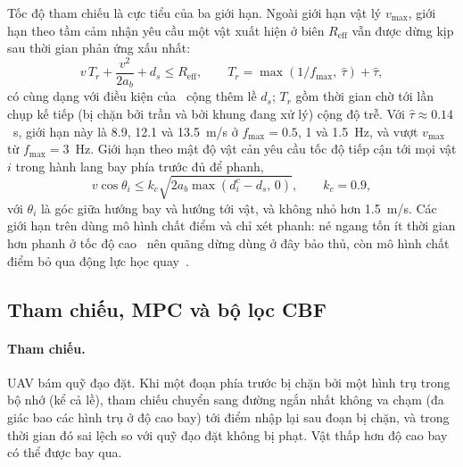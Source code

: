 \documentclass[11pt,a4paper]{article}
\theoremstyle{plain}
\theoremstyle{definition}
\theoremstyle{remark}
\newcommand{\fmax}{f_{\max}}
\newcommand{\tauh}{\hat{\tau}}
\newcommand{\Reff}{R_{\mathrm{eff}}}
\begin{document}
Tốc độ tham chiếu là cực tiểu của ba giới hạn. Ngoài giới hạn vật lý $v_{\max}$, giới hạn theo tầm cảm nhận yêu cầu một vật xuất hiện ở biên $\Reff$ vẫn được dừng kịp sau thời gian phản ứng xấu nhất:
\begin{equation}\label{eq:vperc}
v\,T_r + \frac{v^2}{2a_b} + d_s \le \Reff,\qquad T_r = \max(1/\fmax,\ \tauh) + \tauh,
\end{equation}
có cùng dạng với điều kiện của~\cite{liu2016} cộng thêm lề $d_s$; $T_r$ gồm thời gian chờ tới lần chụp kế tiếp (bị chặn bởi trần và bởi khung đang xử lý) cộng độ trễ. Với $\tauh \approx 0.14$~s, giới hạn này là 8.9, 12.1 và 13.5~m/s ở $\fmax = 0.5$, 1 và 1.5~Hz, và vượt $v_{\max}$ từ $\fmax = 3$~Hz. Giới hạn theo mật độ vật cản yêu cầu tốc độ tiếp cận tới mọi vật $i$ trong hành lang bay phía trước đủ để phanh,
\begin{equation}\label{eq:vclut}
v\cos\theta_i \le k_c\sqrt{2a_b\max(d^c_i - d_s,\,0)},\qquad k_c = 0.9,
\end{equation}
với $\theta_i$ là góc giữa hướng bay và hướng tới vật, và không nhỏ hơn 1.5~m/s. Các giới hạn trên dùng mô hình chất điểm và chỉ xét phanh: né ngang tốn ít thời gian hơn phanh ở tốc độ cao~\cite{falanga2019} nên quãng dừng dùng ở đây bảo thủ, còn mô hình chất điểm bỏ qua động lực học quay~\cite{loquercio2021}.

\subsection{Tham chiếu, MPC và bộ lọc CBF}\label{sec:control}

\paragraph{Tham chiếu.} UAV bám quỹ đạo đặt. Khi một đoạn phía trước bị chặn bởi một hình trụ trong bộ nhớ (kể cả lề), tham chiếu chuyển sang đường ngắn nhất không va chạm (đa giác bao các hình trụ ở độ cao bay) tới điểm nhập lại sau đoạn bị chặn, và trong thời gian đó sai lệch so với quỹ đạo đặt không bị phạt. Vật thấp hơn độ cao bay có thể được bay qua.
\end{document}
